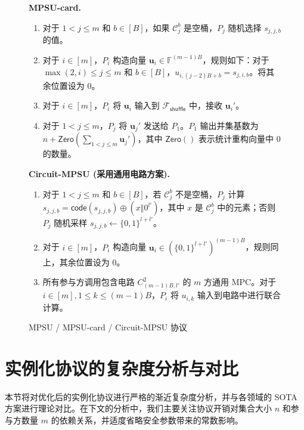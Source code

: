 \begin{figure}[!htbp]
\begin{framed}
\begin{minipage}[c]{\textwidth}
\begin{trivlist}
    \textbf{MPSU-card.} 
    \begin{enumerate}[itemsep=2pt,topsep=0pt,parsep=0pt,leftmargin=15pt] \addtocounter{enumi}{2}
        \item 对于 $1 < j \le m$ 和 $b \in [B]$，如果 $\mathcal{C}_j^b$ 是空桶，$P_j$ 随机选择 $s_{j,j,b}$ 的值。
        \item 对于 $i \in [m]$，$P_i$ 构造向量 $\textbf{u}_i \in \mathbb{F}^{(m-1)B}$，规则如下：对于 $\max(2,i) \le j \le m$ 和 $b \in [B]$，$u_{i,(j-2)B+b} = s_{j,i,b}$。将其余位置设为 $0$。
        \item 对于 $i \in [m]$，$P_i$ 将 $\textbf{u}_i$ 输入到 $\mathcal{F}_{\mathsf{shuffle}}$ 中，接收 $\textbf{u}_{i}'$。
        \item 对于 $1 < j \le m$，$P_j$ 将 $\textbf{u}_j'$ 发送给 $P_1$。$P_1$ 输出并集基数为 $n + \mathsf{Zero}(\sum_{1 < j \le m} \textbf{u}_j')$，其中 $\mathsf{Zero}()$ 表示统计重构向量中 0 的数量。
    \end{enumerate}
    
    \textbf{Circuit-MPSU (采用通用电路方案).}
    \begin{enumerate}[itemsep=2pt,topsep=0pt,parsep=0pt,leftmargin=15pt] \addtocounter{enumi}{2}
        \item 对于 $1 < j \le m$ 和 $b \in [B]$，若 $\mathcal{C}_j^b$ 不是空桶，$P_j$ 计算 $s_{j,j,b} = \mathsf{code}(s_{j,j,b}) \oplus (x \Vert 0^{l'})$，其中 $x$ 是 $\mathcal{C}_j^b$ 中的元素；否则 $P_j$ 随机采样 $s_{j,j,b} \gets \{0,1\}^{l+l'}$。
        \item 对于 $i \in [m]$，$P_i$ 构造向量 $\textbf{u}_i \in (\{0,1\}^{l+l'})^{(m-1)B}$，规则同上，其余位置设为 $0$。
        \item 所有参与方调用包含电路 $C_{(m-1)B,l'}^2$ 的 $m$ 方通用 MPC。对于 $i \in [m], 1 \le k \le (m-1)B$，$P_i$ 将 $u_{i,k}$ 输入到电路中进行联合计算。
    \end{enumerate}
\end{trivlist}
\end{minipage}
\end{framed}
\caption{MPSU / MPSU-card / Circuit-MPSU 协议}\label{fig:proto-mpsu}
\end{figure}

\section{实例化协议的复杂度分析与对比}

本节将对优化后的实例化协议进行严格的渐近复杂度分析，并与各领域的 SOTA 方案进行理论对比。在下文的分析中，我们主要关注协议开销对集合大小 $n$ 和参与方数量 $m$ 的依赖关系，并适度省略安全参数带来的常数影响。

